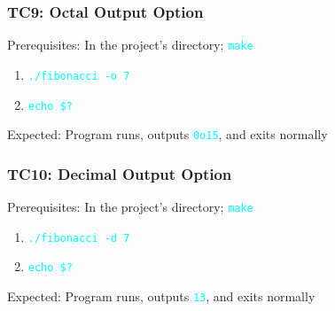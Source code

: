 \documentclass{article}
\newcommand{\code}[1]{\textcolor{cyan}{\texttt{#1}}}
\begin{document}
\subsubsection{TC9: Octal Output Option}
Prerequisites: In the project's directory; \code{make}
\begin{enumerate}
	\item \code{./fibonacci -o 7}
	\item \code{echo \$?}
\end{enumerate}
Expected: Program runs, outputs \code{0o15}, and exits normally


\subsubsection{TC10: Decimal Output Option}
Prerequisites: In the project's directory; \code{make}
\begin{enumerate}
	\item \code{./fibonacci -d 7}
	\item \code{echo \$?}
\end{enumerate}
Expected: Program runs, outputs \code{13}, and exits normally
\end{document}
